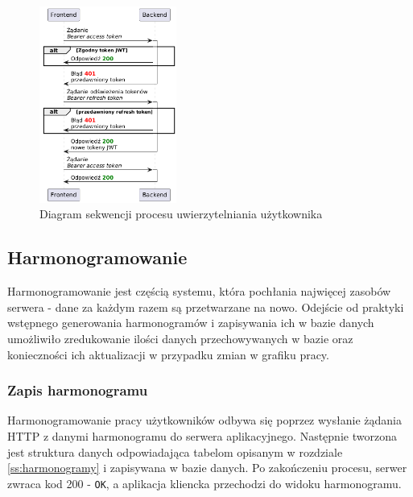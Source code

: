 \begin{figure} [H]
    \centering
    \includegraphics[width=0.4\textwidth]{graf/jwtSeq.png}
    \caption{Diagram sekwencji procesu uwierzytelniania użytkownika}
    \label{fig:authSequence}
\end{figure}

\subsection{Harmonogramowanie}

Harmonogramowanie jest częścią systemu, która pochłania najwięcej zasobów serwera - dane za każdym razem są przetwarzane na nowo. Odejście od praktyki wstępnego generowania harmonogramów i zapisywania ich w bazie danych umożliwiło zredukowanie ilości danych przechowywanych w bazie oraz konieczności ich aktualizacji w przypadku zmian w grafiku pracy.

\subsubsection{Zapis harmonogramu}

Harmonogramowanie pracy użytkowników odbywa się poprzez wysłanie żądania HTTP z danymi harmonogramu do serwera aplikacyjnego. Następnie tworzona jest struktura danych odpowiadająca tabelom opisanym w rozdziale \ref{ss:harmonogramy} i zapisywana w bazie danych. Po zakończeniu procesu, serwer zwraca kod 200 - \texttt{OK}, a aplikacja kliencka przechodzi do widoku harmonogramu.

